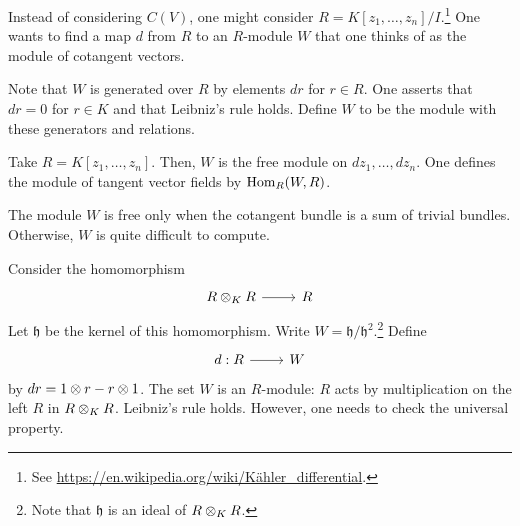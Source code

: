 \documentclass [11 pt, oneside] {article}
\begin{document}
Instead of considering $C(V)$, one might consider $R=K[z_1,\hdots, z_n]/I$.\footnote{See \url{https://en.wikipedia.org/wiki/Kähler_differential}.} One wants to find a map $d$ from $R$ to an $R$-module $W$ that one thinks of as the module of cotangent vectors.

Note that $W$ is generated over $R$ by elements $dr$ for $r\in R$. One asserts that $dr=0$ for $r\in K$ and that Leibniz's rule holds. Define $W$ to be the module with these generators and relations.

\begin{example}[ ]\label{}\text{}
Take $R=K[z_1,\hdots, z_n]$. Then, $W$ is the free module on $dz_1,\hdots, dz_n$. One defines the module of tangent vector fields by $\operatorname{Hom}_{R}(W, R)$.
\end{example}

\begin{remark}
	The module $W$ is free only when the cotangent bundle is a sum of trivial bundles. Otherwise, $W$ is quite difficult to compute.
\end{remark}

Consider the homomorphism 
\[
\begin{tikzcd}
R\tensor_K R\ar[r]& R
\end{tikzcd}
\] 
Let $\mathfrak{h}$ be the kernel of this homomorphism. Write $W = \mathfrak{h}/\mathfrak{h}^2$.\footnote{Note that $\mathfrak{h}$ is an ideal of $R\otimes_K R$.} Define 
\[
\begin{tikzcd}
d:R\ar[r]& W
\end{tikzcd}
\] 
by $dr = 1\otimes r - r\otimes 1$. The set $W$ is an $R$-module: $R$ acts by multiplication on the left $R$ in $R\otimes_K R$. Leibniz's rule holds. However, one needs to check the universal property.
\end{document}

